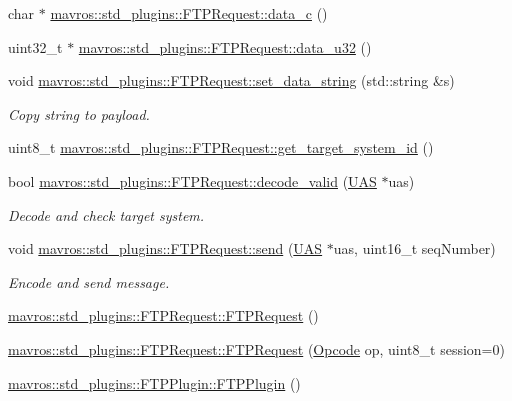 \begin{DoxyCompactItemize}
\item 
char $\ast$ \mbox{\hyperlink{group__plugin_ga0786d26298e7a59ee7e22d9bc0c7f7b1}{mavros\+::std\+\_\+plugins\+::\+F\+T\+P\+Request\+::data\+\_\+c}} ()
\item 
uint32\+\_\+t $\ast$ \mbox{\hyperlink{group__plugin_gae1a0d86b63b05cad94daaaf57bd30a60}{mavros\+::std\+\_\+plugins\+::\+F\+T\+P\+Request\+::data\+\_\+u32}} ()
\item 
void \mbox{\hyperlink{group__plugin_ga79bbc1bfe041055051a72f5c1efb630d}{mavros\+::std\+\_\+plugins\+::\+F\+T\+P\+Request\+::set\+\_\+data\+\_\+string}} (std\+::string \&s)
\begin{DoxyCompactList}\small\item\em Copy string to payload. \end{DoxyCompactList}\item 
uint8\+\_\+t \mbox{\hyperlink{group__plugin_ga49ae6323933afa8b164aaffccb798a0a}{mavros\+::std\+\_\+plugins\+::\+F\+T\+P\+Request\+::get\+\_\+target\+\_\+system\+\_\+id}} ()
\item 
bool \mbox{\hyperlink{group__plugin_gab4fea3506785f409afdfb0917bab879f}{mavros\+::std\+\_\+plugins\+::\+F\+T\+P\+Request\+::decode\+\_\+valid}} (\mbox{\hyperlink{classmavros_1_1UAS}{U\+AS}} $\ast$uas)
\begin{DoxyCompactList}\small\item\em Decode and check target system. \end{DoxyCompactList}\item 
void \mbox{\hyperlink{group__plugin_gadc186f416bee256e70ceecb927d3a135}{mavros\+::std\+\_\+plugins\+::\+F\+T\+P\+Request\+::send}} (\mbox{\hyperlink{classmavros_1_1UAS}{U\+AS}} $\ast$uas, uint16\+\_\+t seq\+Number)
\begin{DoxyCompactList}\small\item\em Encode and send message. \end{DoxyCompactList}\item 
\mbox{\hyperlink{group__plugin_ga65eec8a4ea0ca2018dab26b891c6cd6b}{mavros\+::std\+\_\+plugins\+::\+F\+T\+P\+Request\+::\+F\+T\+P\+Request}} ()
\item 
\mbox{\hyperlink{group__plugin_gafaf43c2f853d7c01415db8b820e6390c}{mavros\+::std\+\_\+plugins\+::\+F\+T\+P\+Request\+::\+F\+T\+P\+Request}} (\mbox{\hyperlink{group__plugin_gaa250490cd75da57eb00865e70210f672}{Opcode}} op, uint8\+\_\+t session=0)
\item 
\mbox{\hyperlink{group__plugin_ga1afc00106987fdf68c2435abdaa93e4c}{mavros\+::std\+\_\+plugins\+::\+F\+T\+P\+Plugin\+::\+F\+T\+P\+Plugin}} ()

\end{DoxyCompactItemize}
